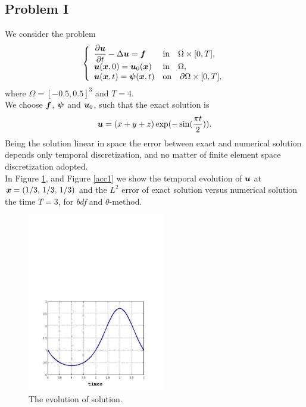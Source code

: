 \documentclass[english,a4paper]{article}
\newcommand{\psibf}{\text{\mbox{\boldmath $\psi$}}}
\newcommand{\ubf}{\text{\mbox{\boldmath $u$}}}
\newcommand{\xbf}{\text{\mbox{\boldmath $x$}}}
\newcommand{\fbf}{\text{\mbox{\boldmath $f$}}}
\begin{document}
\subsection{Problem I} 
We consider the problem
\begin{equation}\label{ex1}
\left\{
\begin{array}{ll}
\displaystyle\frac{\partial \ubf}{\partial t} -\Delta \ubf = \fbf & \text{in}\quad
\Omega\times [0,T],\\
\displaystyle\ubf(\xbf, 0) =  \ubf_0(\xbf)  & \text{in}\quad \Omega,\\
\displaystyle\ubf(\xbf, t) = \psibf(\xbf, t)   & \text{on}\quad \partial\Omega\times[0,T],
\end{array}
\right.
\end{equation}
where $\Omega=[-0.5, 0.5]^3$ and $T=4$.\\
We choose $\fbf$, $\psibf$ and $\ubf_0$, such that the exact solution
is 
\begin{equation}\label{u1ex1}
\ubf = (x+y+z)\exp(-\sin(\frac{\pi
  t}{2})).
\end{equation}
Being the solution linear in space the error  between exact and
numerical solution depends only temporal discretization, and no matter
of finite element space discretization adopted.\\
In Figure \ref{temporal_solution}, and Figure \ref{acc1} we show  the temporal
evolution  of $\ubf$ at $\xbf=(1/3,\,1/3,\,1/3)$ and  the $L^2$ error  of exact solution versus
numerical solution the time $T=3$, for {\sl bdf} and $\theta$-method.
\begin{center}
\begin{figure}[!h]
\centering\includegraphics[width=6cm, height=8cm\textwidth]{figures/tempo.pdf}
\caption{The evolution of solution.} \label{temporal_solution}
\end{figure}
\end{center}
\end{document}
